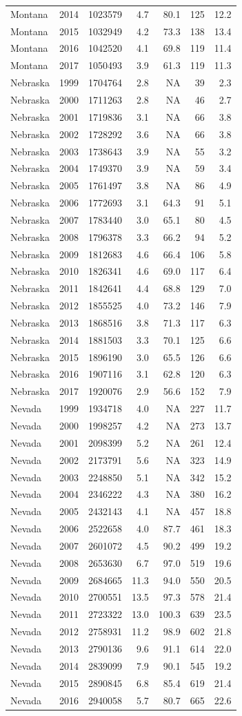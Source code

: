 \documentclass[
]{article}
\begin{document}
\begin{longtable}[]{@{}lrrrrrr@{}}
Montana & 2014 & 1023579 & 4.7 & 80.1 & 125 & 12.2\tabularnewline
Montana & 2015 & 1032949 & 4.2 & 73.3 & 138 & 13.4\tabularnewline
Montana & 2016 & 1042520 & 4.1 & 69.8 & 119 & 11.4\tabularnewline
Montana & 2017 & 1050493 & 3.9 & 61.3 & 119 & 11.3\tabularnewline
Nebraska & 1999 & 1704764 & 2.8 & NA & 39 & 2.3\tabularnewline
Nebraska & 2000 & 1711263 & 2.8 & NA & 46 & 2.7\tabularnewline
Nebraska & 2001 & 1719836 & 3.1 & NA & 66 & 3.8\tabularnewline
Nebraska & 2002 & 1728292 & 3.6 & NA & 66 & 3.8\tabularnewline
Nebraska & 2003 & 1738643 & 3.9 & NA & 55 & 3.2\tabularnewline
Nebraska & 2004 & 1749370 & 3.9 & NA & 59 & 3.4\tabularnewline
Nebraska & 2005 & 1761497 & 3.8 & NA & 86 & 4.9\tabularnewline
Nebraska & 2006 & 1772693 & 3.1 & 64.3 & 91 & 5.1\tabularnewline
Nebraska & 2007 & 1783440 & 3.0 & 65.1 & 80 & 4.5\tabularnewline
Nebraska & 2008 & 1796378 & 3.3 & 66.2 & 94 & 5.2\tabularnewline
Nebraska & 2009 & 1812683 & 4.6 & 66.4 & 106 & 5.8\tabularnewline
Nebraska & 2010 & 1826341 & 4.6 & 69.0 & 117 & 6.4\tabularnewline
Nebraska & 2011 & 1842641 & 4.4 & 68.8 & 129 & 7.0\tabularnewline
Nebraska & 2012 & 1855525 & 4.0 & 73.2 & 146 & 7.9\tabularnewline
Nebraska & 2013 & 1868516 & 3.8 & 71.3 & 117 & 6.3\tabularnewline
Nebraska & 2014 & 1881503 & 3.3 & 70.1 & 125 & 6.6\tabularnewline
Nebraska & 2015 & 1896190 & 3.0 & 65.5 & 126 & 6.6\tabularnewline
Nebraska & 2016 & 1907116 & 3.1 & 62.8 & 120 & 6.3\tabularnewline
Nebraska & 2017 & 1920076 & 2.9 & 56.6 & 152 & 7.9\tabularnewline
Nevada & 1999 & 1934718 & 4.0 & NA & 227 & 11.7\tabularnewline
Nevada & 2000 & 1998257 & 4.2 & NA & 273 & 13.7\tabularnewline
Nevada & 2001 & 2098399 & 5.2 & NA & 261 & 12.4\tabularnewline
Nevada & 2002 & 2173791 & 5.6 & NA & 323 & 14.9\tabularnewline
Nevada & 2003 & 2248850 & 5.1 & NA & 342 & 15.2\tabularnewline
Nevada & 2004 & 2346222 & 4.3 & NA & 380 & 16.2\tabularnewline
Nevada & 2005 & 2432143 & 4.1 & NA & 457 & 18.8\tabularnewline
Nevada & 2006 & 2522658 & 4.0 & 87.7 & 461 & 18.3\tabularnewline
Nevada & 2007 & 2601072 & 4.5 & 90.2 & 499 & 19.2\tabularnewline
Nevada & 2008 & 2653630 & 6.7 & 97.0 & 519 & 19.6\tabularnewline
Nevada & 2009 & 2684665 & 11.3 & 94.0 & 550 & 20.5\tabularnewline
Nevada & 2010 & 2700551 & 13.5 & 97.3 & 578 & 21.4\tabularnewline
Nevada & 2011 & 2723322 & 13.0 & 100.3 & 639 & 23.5\tabularnewline
Nevada & 2012 & 2758931 & 11.2 & 98.9 & 602 & 21.8\tabularnewline
Nevada & 2013 & 2790136 & 9.6 & 91.1 & 614 & 22.0\tabularnewline
Nevada & 2014 & 2839099 & 7.9 & 90.1 & 545 & 19.2\tabularnewline
Nevada & 2015 & 2890845 & 6.8 & 85.4 & 619 & 21.4\tabularnewline
Nevada & 2016 & 2940058 & 5.7 & 80.7 & 665 & 22.6\tabularnewline

\end{longtable}
\end{document}
